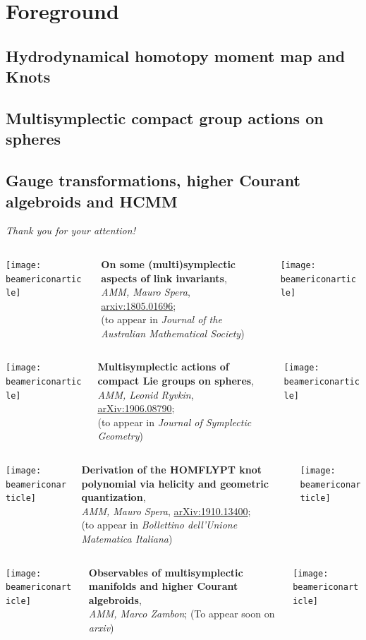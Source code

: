 \documentclass[handout,10pt]{beamer}
\newcommand{\thankyouslide}[0]{
	\ifHandout

	\else
	\addtocounter{framenumber}{-1}
	\begin{frame}{}
		\vfill
	  \centering 
	  {\Huge\color{red} 
	  \emph{Thank you for your attention!}}
		\vfill
		\centering
		\begin{columns}
			\hfill
			\begin{column}{0.05\linewidth}
				\centering \texttt{[image: beamericonarticle]}
			\end{column}
			\begin{column}{0.8\linewidth}
				\centering
				\textbf{On some (multi)symplectic aspects of link invariants},
				\\
				\emph{AMM, Mauro Spera}, \href{https://arXiv.org/abs/1805.01696}{arxiv:1805.01696};\\
				(to appear in \emph{Journal of the Australian Mathematical Society})	
			\end{column}
			\begin{column}{0.05\linewidth}
				\centering \texttt{[image: beamericonarticle]}			
			\end{column}
			\hfill
		\end{columns}
		\vfill
		\begin{columns}
			\hfill
			\begin{column}{0.05\linewidth}
				\centering \texttt{[image: beamericonarticle]}
			\end{column}
			\begin{column}{0.8\linewidth}
				\centering
				\textbf{Multisymplectic actions of compact Lie groups on spheres},
				\\
				\emph{AMM, Leonid Ryvkin}, \href{https://arxiv.org/abs/1906.08790}{arXiv:1906.08790};
				\\
				(to appear in \emph{Journal of Symplectic Geometry})
			\end{column}
			\begin{column}{0.05\linewidth}
				\centering \texttt{[image: beamericonarticle]}			
			\end{column}
			\hfill
		\end{columns}		
		\vfill		
		\begin{columns}
			\hfill
			\begin{column}{0.05\linewidth}
				\centering \texttt{[image: beamericonarticle]}
			\end{column}
			\begin{column}{0.8\linewidth}
				\centering
		\textbf{Derivation of the HOMFLYPT knot polynomial via helicity and geometric quantization},
				\\
		\emph{AMM, Mauro Spera}, \href{https://arxiv.org/abs/1910.13400}{arXiv:1910.13400};\\
				(to appear in \emph{Bollettino dell'Unione Matematica Italiana})	
			\end{column}				
			\begin{column}{0.05\linewidth}
				\centering \texttt{[image: beamericonarticle]}			
			\end{column}
			\hfill
		\end{columns}
		\vfill
		\begin{columns}
			\hfill
			\begin{column}{0.05\linewidth}
				\centering \texttt{[image: beamericonarticle]}
			\end{column}
			\begin{column}{0.8\linewidth}
				\centering
				\textbf{Observables of multisymplectic manifolds and higher Courant algebroids},
				\\
				\emph{AMM, Marco Zambon}; %
				(To appear soon on \emph{arxiv})	
			\end{column}
			\begin{column}{0.05\linewidth}
				\centering \texttt{[image: beamericonarticle]}			
			\end{column}
			\hfill
		\end{columns}
	\end{frame}
	\fi
}
\begin{document}
\section{Foreground}

	\subsection{Hydrodynamical homotopy moment map and Knots}
	\subcheckpoint	
	
	\subsection{Multisymplectic compact group actions on spheres}
	\subcheckpoint	
	
	\subsection{Gauge transformations, higher Courant algebroids and HCMM}
	\subcheckpoint	
	



\thankyouslide


\end{document}
